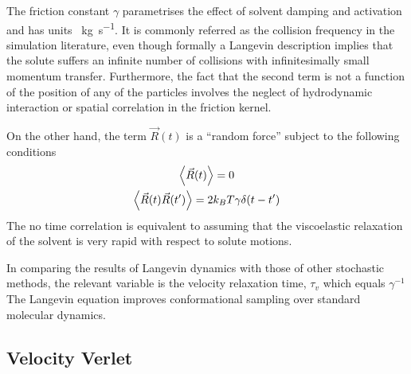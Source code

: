 The friction constant $\gamma$ parametrises the effect of solvent damping and activation and has units \SI{}{\kilo\gram\per\second}.
It is commonly referred as the collision frequency in the simulation literature, even though formally a Langevin description implies that the solute suffers an infinite number of collisions with infinitesimally small momentum transfer.
Furthermore, the fact that the second term is not a function of the position of any of the particles involves the neglect of hydrodynamic interaction or spatial correlation in the friction kernel\citep{pastorTechniquesApplicationsLangevin1994}.

On the other hand, the term $\vec{R}(t)$ is a ``random force'' subject to the following conditions
\begin{gather}
    \expval{\vec{R}(t)} = 0\label{eqn:LagDynamicNoiseExpval} \\
    \expval{\vec{R}(t)\vec{R}(t')} = 2k_{B}T\gamma\delta\qty(t-t')\label{eqn:LagDynamicNoiseCorrelation} 
\end{gather}
The no time correlation is equivalent to assuming that the viscoelastic relaxation of the solvent is very rapid with respect to solute motions\citep{pastorTechniquesApplicationsLangevin1994}.

In comparing the results of Langevin dynamics with those of other stochastic methods, the relevant variable is the velocity relaxation time, $\tau_{v}$ which equals $\gamma^{-1}$\citep{pastorTechniquesApplicationsLangevin1994}
The Langevin equation improves conformational sampling over standard molecular dynamics\citep{paquetMolecularDynamicsMonte2015}.


\subsection{Velocity Verlet}

